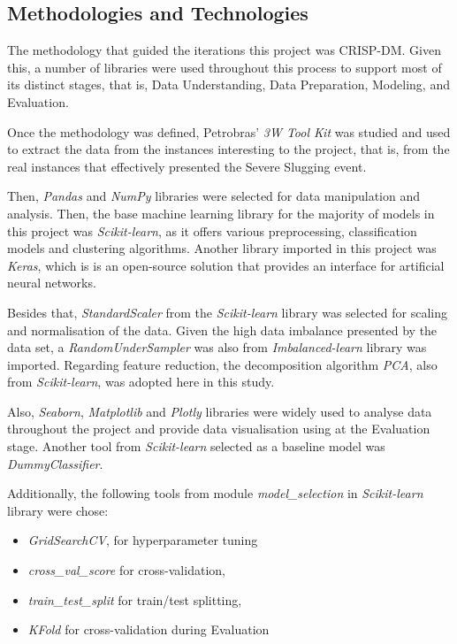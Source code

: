 \documentclass{article}
\begin{document}
\subsection{Methodologies and Technologies}

The methodology that guided the iterations this project was CRISP-DM. Given this, a number of libraries were used throughout this process to support most of its distinct stages, that is, Data Understanding, Data Preparation, Modeling, and Evaluation. 

Once the methodology was defined, Petrobras' \emph{3W Tool Kit} was studied and used to extract the data from the instances interesting to the project, that is, from the real instances that effectively presented the Severe Slugging event.

Then, \emph{Pandas} and \emph{NumPy} libraries were selected for data manipulation and analysis. Then, the base machine learning library for the majority of models in this project was \emph{Scikit-learn}, as it offers various preprocessing, classification models and clustering algorithms. Another library imported in this project was \emph{Keras}, which is is an open-source solution that provides an interface for artificial neural networks.

Besides that, \emph{StandardScaler} from the \emph{Scikit-learn} library was selected for scaling and normalisation of the data. Given the high data imbalance presented by the data set, a \emph{RandomUnderSampler} was also from \emph{Imbalanced-learn} library was imported. Regarding feature reduction, the decomposition algorithm \emph{PCA}, also from \emph{Scikit-learn}, was adopted here in this study. 

Also, \emph{Seaborn}, \emph{Matplotlib} and \emph{Plotly} libraries were widely used to analyse data throughout the project and provide data visualisation using at the Evaluation stage. Another tool from \emph{Scikit-learn} selected as a baseline model was \emph{DummyClassifier}. 

Additionally, the following tools from module \emph{model\_selection} in \emph{Scikit-learn} library were chose:

\begin{itemize}
    \item \emph{GridSearchCV}, for hyperparameter tuning
    \item \emph{cross\_val\_score} for cross-validation, 
    \item \emph{train\_test\_split} for train/test splitting,
    \item \emph{KFold} for cross-validation during Evaluation
\end{itemize}
\end{document}

